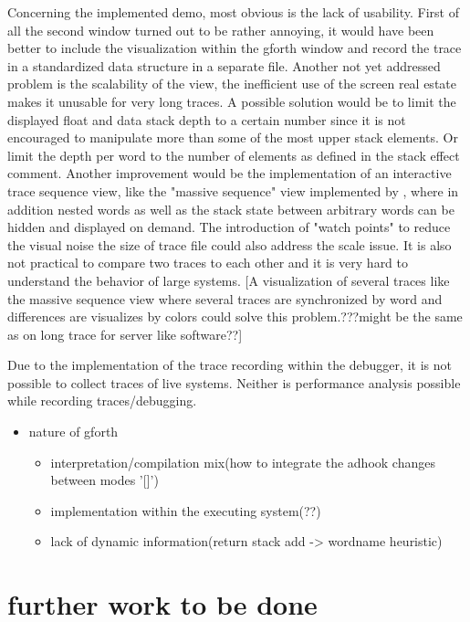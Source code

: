 Concerning the implemented demo, most obvious is the lack of usability. First of all the second window turned out to be rather annoying, it would have been better to include the visualization within the gforth window and record the trace in a standardized data structure in a separate file.
Another not yet addressed problem is the scalability of the view, the inefficient use of the screen real estate makes it unusable for very long traces. A possible solution would be to limit the displayed float and data stack depth to a certain number since it is not encouraged to manipulate more than some of the most upper stack elements. Or limit the depth per word to the number of elements as defined in the stack effect comment. Another improvement would be the implementation of an interactive trace sequence view, like the "massive sequence" view implemented by \cite{Cornelissen:2008:ETA:1454787.1454981}, where in addition nested words as well as the stack state between arbitrary words can be hidden and displayed on demand. The introduction of "watch points" to reduce the visual noise the size of trace file could also address the scale issue.
It is also not practical to compare two traces to each other and it is very hard to understand the behavior of large systems. [A visualization of several traces like the massive sequence view where several traces are synchronized by word and differences are visualizes by colors could solve this problem.???might be the same as on long trace for server like software??]

Due to the implementation of the trace recording within the debugger, it is not possible to collect traces of live systems. Neither is performance analysis possible while recording traces/debugging.


\begin{itemize}
\item nature of gforth
	\begin{itemize}
	\item interpretation/compilation mix(how to integrate the adhook changes between modes '[]')
	\item implementation within the executing system(??)
	\item lack of dynamic information(return stack add -> wordname heuristic)
	\end{itemize}
\end{itemize}

\section{further work to be done}

